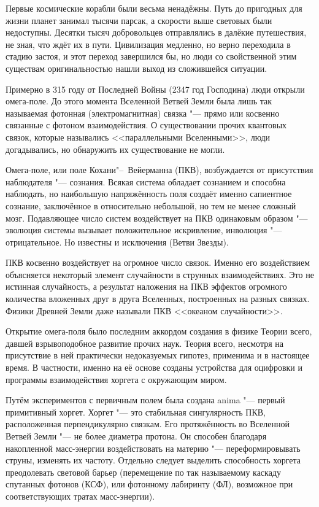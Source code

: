 Первые космические корабли были весьма ненадёжны.
Путь до пригодных для жизни планет занимал тысячи парсак, а скорости выше световых были недоступны.
Десятки тысяч добровольцев отправлялись в далёкие путешествия, не зная, что ждёт их в пути.
Цивилизация медленно, но верно переходила в стадию застоя, и этот переход завершился бы, но люди со свойственной этим существам оригинальностью нашли выход из сложившейся ситуации.

Примерно в 315 году от Последней Войны (2347 год Господина) люди открыли омега-поле.
До этого момента Вселенной Ветвей Земли была лишь так называемая фотонная (электромагнитная) связка "--- прямо или косвенно связанные с фотоном взаимодействия.
О существовании прочих квантовых связок, которые назывались <<параллельными Вселенными>>, люди догадывались, но обнаружить их существование не могли.

Омега-поле, или поле Кохани"--~Вейерманна (ПКВ), возбуждается от присутствия наблюдателя "--- сознания.
Всякая система обладает сознанием и способна наблюдать, но наибольшую напряжённость поля создаёт именно сапиентное сознание, заключённое в относительно небольшой, но тем не менее сложный мозг.
Подавляющее число систем воздействует на ПКВ одинаковым образом "--- эволюция системы вызывает положительное искривление, инволюция "--- отрицательное.
Но известны и исключения (Ветви Звезды).

ПКВ косвенно воздействует на огромное число связок.
Именно его воздействием объясняется некоторый элемент случайности в струнных взаимодействиях.
Это не истинная случайность, а результат наложения на ПКВ эффектов огромного количества вложенных друг в друга Вселенных, построенных на разных связках.
Физики Древней Земли даже называли ПКВ <<океаном случайности>>.

Открытие омега-поля было последним аккордом создания в физике Теории всего, давшей взрывоподобное развитие прочих наук.
Теория всего, несмотря на присутствие в ней практически недоказуемых гипотез, применима и в настоящее время.
В частности, именно на её основе созданы устройства для оцифровки и программы взаимодействия хоргета с окружающим миром.

Путём экспериментов с первичным полем была создана anima "--- первый примитивный хоргет.
Хоргет "--- это стабильная сингулярность ПКВ, расположенная перпендикулярно связкам.
Его протяжённость во Вселенной Ветвей Земли "--- не более диаметра протона.
Он способен благодаря накопленной масс-энергии воздействовать на материю "--- переформировывать струны, изменять их частоту.
Отдельно следует выделить способность хоргета преодолевать световой барьер (перемещение по так называемому каскаду спутанных фотонов (КСФ), или фотонному лабиринту (ФЛ), возможное при соответствующих тратах масс-энергии).

